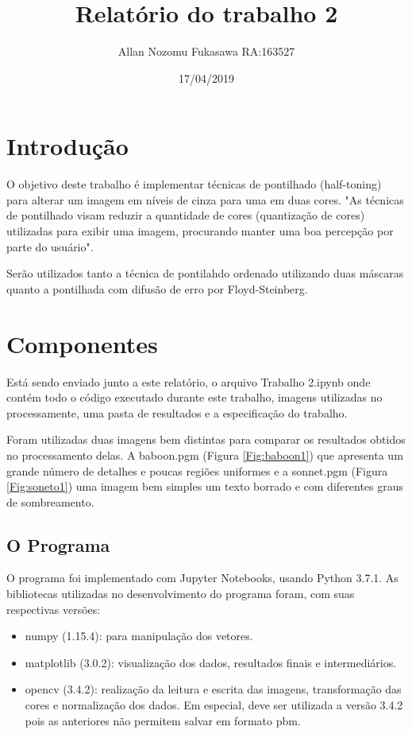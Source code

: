 \documentclass{article}
\title{Relatório do trabalho 2}
\date{17/04/2019}
\author{Allan Nozomu Fukasawa RA:163527}
\begin{document}
\maketitle

\section{Introdução}

O objetivo deste trabalho é implementar técnicas de pontilhado (half-toning) para alterar um imagem em níveis de cinza para uma em duas cores. "As técnicas de pontilhado visam reduzir a quantidade de cores (quantização de cores) utilizadas para exibir
uma imagem, procurando manter uma boa percepção por parte do usuário". \cite{Helio:1}

Serão utilizados tanto a técnica de pontilahdo ordenado  utilizando duas máscaras quanto a pontilhada com difusão de erro por Floyd-Steinberg. 

\section{Componentes}

Está sendo enviado junto a este relatório, o arquivo Trabalho 2.ipynb onde contém todo o código executado durante este trabalho, imagens utilizadas no processamente, uma pasta de resultados e a especificação do trabalho.

Foram utilizadas duas imagens bem distintas para comparar os resultados obtidos no processamento delas. A baboon.pgm (Figura \ref{Fig:baboon1}) que apresenta um grande número de detalhes e poucas regiões uniformes e a sonnet.pgm (Figura \ref{Fig:soneto1}) uma imagem bem simples um texto borrado e com diferentes graus de sombreamento.

\subsection{O Programa}

O programa foi implementado com Jupyter Notebooks, usando Python 3.7.1. As bibliotecas utilizadas no desenvolvimento do programa foram, com suas respectivas versões: 

\begin{itemize}
    \item numpy (1.15.4): para manipulação dos vetores.

    \item matplotlib (3.0.2): visualização dos dados, resultados finais e intermediários.

    \item opencv (3.4.2): realização da leitura e escrita das imagens, transformação das cores e normalização dos dados. Em especial, deve ser utilizada a versão 3.4.2 pois as anteriores não permitem salvar em formato pbm.
\end{itemize}
\end{document}
